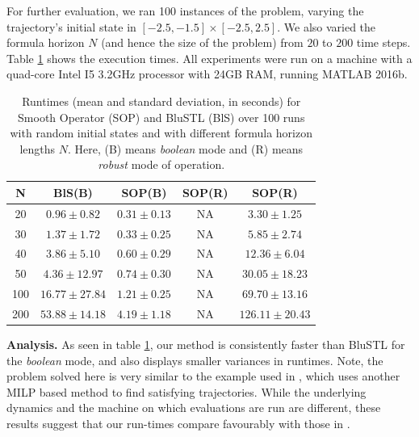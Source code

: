 \begin{exmp}
For further evaluation, we ran 100 instances of the problem, varying the trajectory's initial state in $[-2.5,-1.5] \times [-2.5,2.5]$. We also varied the formula horizon $N$ (and hence the size of the problem) from $20$ to $200$ time steps. 
Table \ref{tbl:time_performance_toy} shows the execution times. All experiments were run on a machine with a quad-core Intel I5 3.2GHz processor with 24GB RAM, running MATLAB 2016b.



\begin{table}[tb]
\small
\begin{center}
\caption{{\small Runtimes (mean and standard deviation, in seconds) for Smooth Operator (SOP) and BluSTL (BlS) over 100 runs with random initial states and with different formula horizon lengths $N$. Here, (B) means \textit{boolean} mode and (R) means \textit{robust} mode of operation.}}
\vspace{-5pt}
\label{tbl:time_performance_toy}
\begin{tabular} {|c|c|c|c|c|}
	\hline
	N & BlS(B) & SOP(B) & SOP(R) & SOP(R) \\ \hline
	20 & $0.96 \pm 0.82$ &  $\mathbf{0.31 \pm 0.13}$  & NA & $3.30 \pm 1.25$ \\ \hline
	30 & $1.37 \pm 1.72$ &  $\mathbf{0.33 \pm 0.25}$  & NA & $5.85 \pm 2.74$\\ \hline
	40 & $3.86 \pm 5.10$ &  $\mathbf{0.60 \pm 0.29}$  & NA & $12.36 \pm 6.04$\\ \hline
	50 & $4.36 \pm 12.97$&  $\mathbf{0.74 \pm 0.30}$ & NA & $30.05 \pm 18.23$\\ \hline
	100& $16.77 \pm 27.84$ & $\mathbf{1.21 \pm 0.25}$ & NA & $69.70 \pm 13.16$ \\ \hline
	200& $53.88 \pm 14.18$& $\mathbf{4.19 \pm 1.18}$ & NA & $126.11 \pm 20.43$ \\ \hline
\end{tabular}	
\end{center}
\end{table}

\textbf{Analysis.}
As seen in table \ref{tbl:time_performance_toy}, our method is consistently faster than BluSTL for the \textit{boolean} mode, and also displays smaller variances in runtimes. Note, the problem solved here is very similar to the example used in \cite{Saha_acc16}, which uses another MILP based method to find satisfying trajectories. While the underlying dynamics and the machine on which evaluations are run are different, these results suggest that our run-times compare favourably with those in \cite{Saha_acc16}.


\end{exmp}
